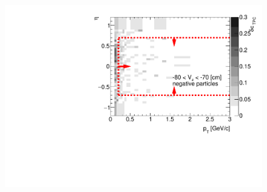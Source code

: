 \begin{figure}[H]\ContinuedFloat
	\vspace{-3.5em}
	\parbox{0.325\textwidth}{
		\includegraphics[width=\linewidth,page=16]{graphics/systematicsEfficiency/deadMaterial/secondaries_Unbinned_Charged_SD.pdf}\\
	}~
	\vspace{-4em}
\end{figure}
